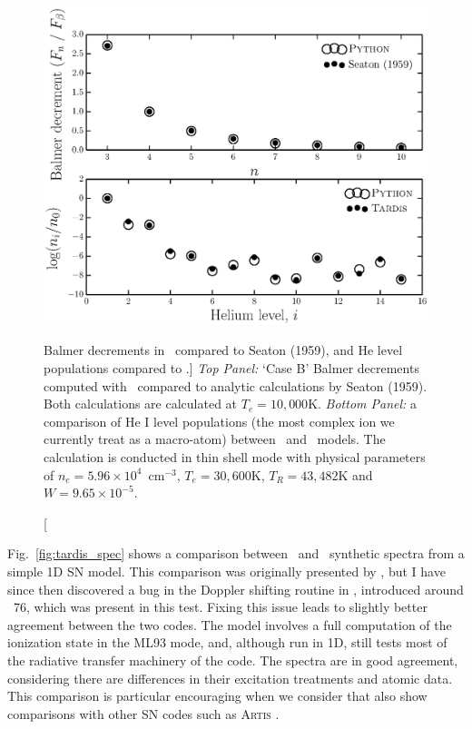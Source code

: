 \begin{figure}
\centering
\includegraphics[width=1.0\textwidth]{figures/05-cvpaper/fig_caseb_tardis.eps}
\caption
[Balmer decrements in \py\ compared to Seaton (1959), and He level populations
compared to \tar.]
{
{\sl Top Panel:} `Case B' Balmer decrements computed 
with \py\ compared to analytic calculations
by Seaton (1959). Both calculations are calculated at $T_e=10,000$K.
{\sl Bottom Panel:}  a comparison of He I level populations (the most complex ion we currently 
treat as a macro-atom) between \py\ and \tar\ models. 
The calculation is conducted in thin shell mode
with physical parameters of $n_e=5.96\times10^4$~cm$^{-3}$,
$T_e=30,600$K, $T_R=43,482$K and $W=9.65\times10^{-5}$. 
}
\label{fig:caseb_tests}
\end{figure}

Fig.~\ref{fig:tardis_spec} shows a comparison 
between \tar\ and \py\ synthetic spectra from 
a simple 1D SN model. This comparison was originally presented by
\cite{kerzendorfsim}, but I have since then discovered a bug in the Doppler shifting
routine in \py, introduced around \py\ 76, which was present in this test. 
Fixing this issue leads to slightly better agreement between the two codes. 
The model involves a full computation of the ionization state in the 
ML93 mode, and, although run in 1D, still tests most of the radiative transfer
machinery of the code. The spectra are in good agreement, considering
there are differences in their excitation treatments and atomic data.
This comparison is particular encouraging when we consider
that \cite{kerzendorfsim} also show comparisons with other SN codes such
as \textsc{Artis} \citep{kromersim2009}.

